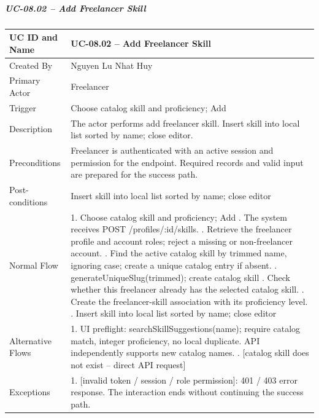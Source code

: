 \subparagraph{UC-08.02 -- Add Freelancer Skill}
{\singlespacing\small
\begin{longtable}{|L{3.2cm}|L{11.1cm}|}\hline
UC ID and Name & UC-08.02 -- Add Freelancer Skill \\ \hline
Created By & Nguyen Lu Nhat Huy \\ \hline
Primary Actor & Freelancer \\ \hline
Trigger & Choose catalog skill and proficiency; Add \\ \hline
Description & The actor performs add freelancer skill. Insert skill into local list sorted by name; close editor. \\ \hline
Preconditions & Freelancer is authenticated with an active session and permission for the endpoint. Required records and valid input are prepared for the success path. \\ \hline
Post-conditions & Insert skill into local list sorted by name; close editor \\ \hline
Normal Flow & 1. Choose catalog skill and proficiency; Add . The system receives POST /\allowbreak{}profiles/\allowbreak{}:id/\allowbreak{}skills. . Retrieve the freelancer profile and account roles; reject a missing or non-freelancer account. . Find the active catalog skill by trimmed name, ignoring case; create a unique catalog entry if absent. . generate\allowbreak{}Unique\allowbreak{}Slug(trimmed); create catalog skill . Check whether this freelancer already has the selected catalog skill. . Create the freelancer-skill association with its proficiency level. . Insert skill into local list sorted by name; close editor \\ \hline
Alternative Flows & 1. UI preflight: search\allowbreak{}Skill\allowbreak{}Suggestions(name); require catalog match, integer proficiency, no local duplicate. API independently supports new catalog names. . [catalog skill does not exist -- direct API request] \\ \hline
Exceptions & 1. [invalid token /\allowbreak{} session /\allowbreak{} role permission]: 401 /\allowbreak{} 403 error response. The interaction ends without continuing the success path. \newline

\end{longtable}}
